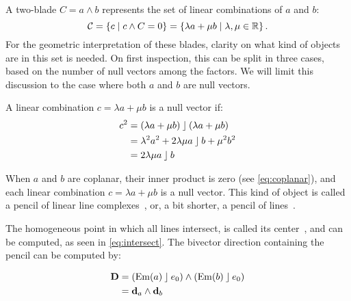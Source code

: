 A two-blade
$C = a \wedge b$ represents the set of linear combinations of $a$ and $b$:
\begin{equation*}
  \mathcal{C} = \left\{ c \mid c \wedge C = 0 \right\} = \left\{ \lambda a + \mu b \mid \lambda, \mu \in \mathbb{R} \right\} .
\end{equation*}
For the geometric interpretation of these blades, clarity on what kind of objects are in this set is needed.  On first inspection, this can be split in three cases, based on the number of null vectors among the factors.  We will limit this discussion to the case where both $a$ and $b$ are null vectors.

A linear combination $c = \lambda a + \mu b$ is a null vector if:
\begin{align}
  \label{eq:lincombnull}
  c^2 &= (\lambda a + \mu b) \mathbin{\rfloor} (\lambda a + \mu b) \nonumber \\
  &= \lambda^2 a^2 + 2 \lambda \mu a \mathbin{\rfloor} b + \mu^2 b^2 \nonumber \\
  &= 2 \lambda \mu a \mathbin{\rfloor} b
\end{align}

When $a$ and $b$ are coplanar, their inner product is zero (see \autoref{eq:coplanar}), and each linear combination $c = \lambda a + \mu b$ is a null vector.  This kind of object is called a pencil of linear line complexes~\cite[Section 3.2.1]{Pottmann}, or, a bit shorter, a pencil of lines~\cite{Hongbo}.

The homogeneous point in which all lines intersect, is called its center~\cite{Hongbo}, and can be computed, as seen in \autoref{eq:intersect}.  The bivector direction containing the pencil can be computed by:

\begin{align*}
  \mathbf{D} &= \left(\operatorname{Em}(a) \mathbin{\rfloor} e_0 \right) \wedge \left(\operatorname{Em}(b) \mathbin{\rfloor} e_0\right) \\
  &= \mathbf{d}_a \wedge \mathbf{d}_b 
\end{align*}

